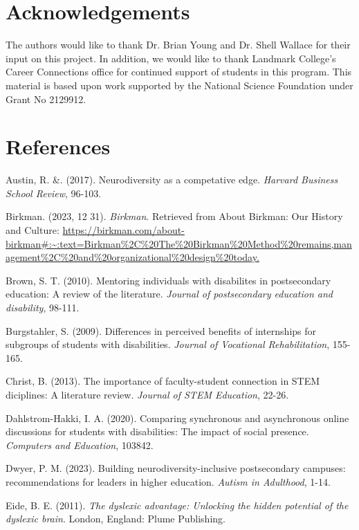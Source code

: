 \documentclass[11.5pt]{sig-alternate}
\begin{document}
\begin{large}
\section*{Acknowledgements}

The authors would like to thank Dr. Brian Young and Dr. Shell Wallace for their input on this project. In addition, we would like to thank Landmark College's Career Connections office for continued support of students in this program. This material is based upon work supported by the National Science Foundation under Grant No 2129912.

\clearpage
\section*{References}\par 

\leftskip 0.25in
\parindent -0.25in 

Austin, R. \&. (2017). Neurodiversity as a competative edge. \textit{Harvard Business School Review}, 96-103.

Birkman. (2023, 12 31). \textit{Birkman}. Retrieved from About Birkman: Our History and Culture: \url{https://birkman.com/about-birkman#:~:text=Birkman%2C%20The%20Birkman%20Method%20remains,management%2C%20and%20organizational%20design%20today.}

Brown, S. T. (2010). Mentoring individuals with disabilites in postsecondary education: A review of the literature. \textit{Journal of postsecondary education and disability}, 98-111.

Burgstahler, S. (2009). Differences in perceived benefits of internships for subgroups of students with disabilities. \textit{Journal of Vocational Rehabilitation}, 155-165.

Christ, B. (2013). The importance of faculty-student connection in STEM diciplines: A literature review. \textit{Journal of STEM Education}, 22-26.

Dahlstrom-Hakki, I. A. (2020). Comparing synchronous and asynchronous online discussions for students with disabilities: The impact of social presence. \textit{Computers and Education}, 103842.

Dwyer, P. M. (2023). Building neurodiversity-inclusive postsecondary campuses: recommendations for leaders in higher education. \textit{Autism in Adulthood}, 1-14.

Eide, B. E. (2011). \textit{The dyslexic advantage: Unlocking the hidden potential of the dyslexic brain}. London, England: Plume Publishing.


\end{large}
\end{document}
